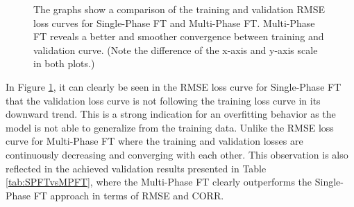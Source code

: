 \begin{figure}[htbp]
  \centering
  \hfill
  \caption[Ablation study: Multi-Phase FT loss curves]{The graphs show a comparison of the training and validation RMSE loss curves for Single-Phase FT and Multi-Phase FT. Multi-Phase FT reveals a better and smoother convergence between training and validation curve. (Note the difference of the x-axis and y-axis scale in both plots.)}
  \label{fig:SPFTvsMPFT}
\end{figure}

\noindent In Figure \ref{fig:SPFTvsMPFT}, it can clearly be seen in the RMSE loss curve for Single-Phase FT that the validation loss curve is not following the training loss curve in its downward trend. This is a strong indication for an overfitting behavior as the model is not able to generalize from the training data. Unlike the RMSE loss curve for Multi-Phase FT where the training and validation losses are continuously decreasing and converging with each other. This observation is also reflected in the achieved validation results presented in Table \ref{tab:SPFTvsMPFT}, where the Multi-Phase FT clearly outperforms the Single-Phase FT approach in terms of RMSE and CORR.

